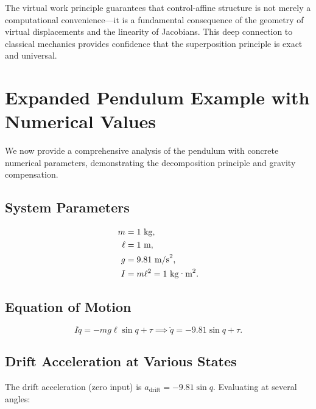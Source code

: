 \begin{designbox}
The virtual work principle guarantees that control-affine structure is not merely
a computational convenience---it is a fundamental consequence of the geometry of virtual
displacements and the linearity of Jacobians. This deep connection to classical mechanics
provides confidence that the superposition principle is exact and universal.
\end{designbox}


\section{Expanded Pendulum Example with Numerical Values}

We now provide a comprehensive analysis of the pendulum with concrete numerical parameters,
demonstrating the decomposition principle and gravity compensation.

\subsection{System Parameters}

\begin{equation}
\begin{aligned}
m &= 1 \text{ kg}, \\
\ell &= 1 \text{ m}, \\
g &= 9.81 \text{ m/s}^2, \\
I &= m\ell^2 = 1 \text{ kg\textperiodcentered{}m}^2.
\end{aligned}
\label{eq:ch3:pendulum-params}
\end{equation}

\subsection{Equation of Motion}

\begin{equation}
I\ddot q = -mg\ell\sin q + \tau
\implies
\ddot q = -9.81\sin q + \tau.
\label{eq:ch3:pendulum-eom}
\end{equation}

\subsection{Drift Acceleration at Various States}

The drift acceleration (zero input) is $a_{\text{drift}} = -9.81\sin q$. Evaluating at
several angles:

